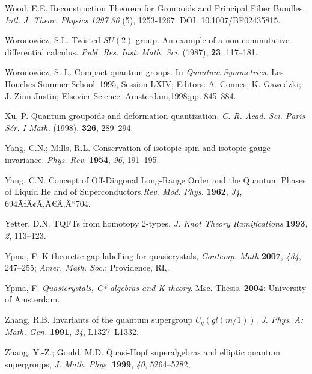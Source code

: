 \documentclass[12pt]{article}
\theoremstyle{plain}
\theoremstyle{definition}
\numberwithin{equation}{section}
\begin{document}
\begin{thebibliography}{99}
Wood, E.E. Reconstruction Theorem for Groupoids and Principal Fiber Bundles. {\em Intl. J. Theor. Physics} {\em 1997} {\em 36} (5), 1253-1267.  DOI: 10.1007/BF02435815. 

Woronowicz, S.L. Twisted $SU(2)$ group. An example of a non-commutative differential calculus. \emph{Publ. Res. Inst. Math. Sci. } (1987), {\bf 23},
117--181.

Woronowicz, S. L. Compact quantum groups. In \emph{Quantum Symmetries.}  Les Houches Summer School--1995, Session LXIV; Editors: A. Connes; K. Gawedzki; J. Zinn-Justin; Elsevier Science: Amsterdam,1998;pp. 845--884.

Xu, P. Quantum groupoids and deformation quantization. \emph{C. R. Acad. Sci. Paris S\'{e}r. I Math.} (1998), {\bf 326}, 289--294.  %

Yang, C.N.; Mills, R.L. Conservation of isotopic spin and isotopic gauge invariance. {\em Phys. Rev.} {\bf 1954}, {\em 96}, 191--195.

Yang, C.N. Concept of Off-Diagonal Long-Range Order and the Quantum Phases of Liquid He and of Superconductors.{\em Rev. Mod. Phys.} {\bf 1962}, {\em 34}, 694ÃƒÂ¢Ã‚Â€Ã‚Â“704.

Yetter, D.N. TQFTs from homotopy 2-types. \textit{J. Knot Theory Ramifications} {\bf 1993}, {\em 2}, 113--123.

Ypma, F.  K-theoretic gap labelling for quasicrystals, {\em Contemp. Math.}{\bf 2007}, {\em 434}, 247--255; \emph{Amer. Math. Soc.}: Providence, RI,.

Ypma, F. {\em Quasicrystals, C*-algebras and K-theory}. Msc. Thesis. {\bf 2004}: University of Amsterdam.

Zhang, R.B. Invariants of the quantum supergroup $U_q(gl(m/1))$. {\em J. Phys. A: Math. Gen.} {\bf 1991}, {\em 24}, L1327--L1332.

Zhang, Y.-Z.; Gould,  M.D. Quasi-Hopf superalgebras and elliptic quantum supergroups, \emph{J. Math. Phys.} {\bf 1999}, {\em 40}, 5264--5282,

\end{thebibliography}

\end{document}
